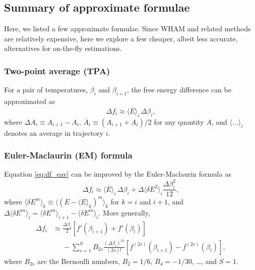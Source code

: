 \documentclass[aip,jcp,preprint,notitlepage, superscriptaddress]{revtex4-1}
\begin{document}
\subsection{Summary of approximate formulae}

Here, we listed a few approximate formulae.
%
Since WHAM and related methods
are relatively expensive,
here we explore a few cheaper,
albeit less accurate, alternatives
for on-the-fly estimations\cite{park2007}.



\subsubsection{Two-point average (TPA)}



For a pair of temperatures,
$\beta_i$ and $\beta_{i+1}$,
the free energy difference
can be approximated as\cite{park2007}
%
\begin{equation}
\Delta f_i
\approx
\overline{ \langle E \rangle }_i \, \Delta \beta_i,
\label{eq:df_eav}
\end{equation}
%
where
$\Delta A_i \equiv A_{i+1} - A_i$,
$\overline{ A }_i \equiv (A_{i+1} + A_i)/2$
for any quantity $A$,
and
$\langle\dots\rangle_i$
denotes an average in trajectory $i$.
%


\subsubsection{Euler-Maclaurin (EM) formula}



Equation \eqref{eq:df_eav} can be improved
by the Euler-Maclaurin formula\cite{
arfken, *whittaker, *wang_specfunc}
as
%
\begin{equation}
\Delta f_i
\approx
\overline{ \langle E \rangle }_i \, \Delta \beta_i
+
\Delta \langle \delta E^2 \rangle_i
\frac{ \Delta \beta_i^2 }{ 12 },
\label{eq:df_eavb}
\end{equation}
where
$\langle \delta E^m \rangle_k
\equiv \langle (E - \langle E \rangle_k)^m \rangle_k$
for $k = i$ and $i + 1$,
and
$\Delta \langle \delta E^m \rangle_i
= \langle \delta E^m \rangle_{i + 1}
- \langle \delta E^m \rangle_{i}$.
%
More generally,
%
\begin{align*}
\Delta f_i
&\approx
\frac{\Delta \beta_i}{2}
\left[
  f'(\beta_{i+1}) + f'(\beta_i)
\right]
\\
&\phantom{=}
-
\sum_{s = 1}^{S}
  B_{2s}
  \frac{ (\Delta \beta_i)^{2s} } { (2 s)! }
  \left[
    f^{(2s)}(\beta_{i+1})
    -
    f^{(2s)}(\beta_i)
  \right],
\end{align*}
%
where $B_{2s}$ are the Bernoulli numbers,
$B_2 = 1/6$, $B_4 = -1/30$, \ldots,
and $S = 1$.
\end{document}

